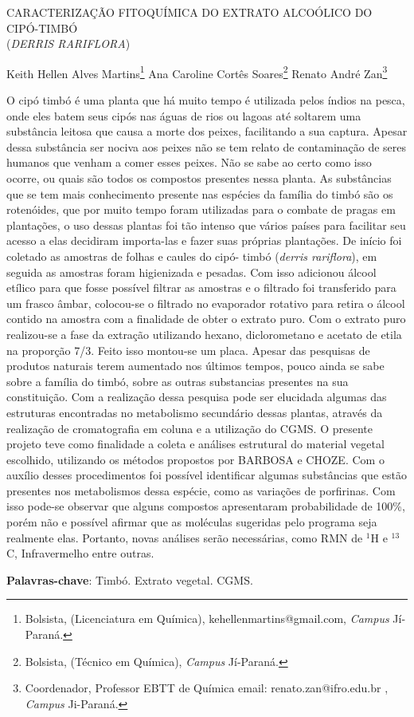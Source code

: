 \documentclass[article,12pt,onesidea,4paper,english,brazil]{abntex2}
\begin{document}
	
	
	\frenchspacing 
	
	\begin{center}
		\LARGE CARACTERIZAÇÃO FITOQUÍMICA DO EXTRATO ALCOÓLICO DO CIPÓ-TIMBÓ \\(\textit{DERRIS RARIFLORA})
		
		\normalsize
		Keith Hellen Alves Martins\footnote{Bolsista, (Licenciatura em Química), kehellenmartins@gmail.com, \textit{Campus} Jí-Paraná.} 
		Ana Caroline Cortês Soares\footnote{Bolsista, (Técnico em Química), \textit{Campus} Jí-Paraná.} 
		Renato André Zan\footnote{Coordenador, Professor EBTT de Química email: renato.zan@ifro.edu.br , \textit{Campus} Ji-Paraná.} 
	\end{center}
	
	\noindent O cipó timbó é uma planta que há muito tempo é utilizada pelos índios na pesca, onde eles batem seus cipós nas águas de rios ou lagoas até soltarem
	uma substância leitosa que causa a morte dos peixes, facilitando a sua captura.
	Apesar dessa substância ser nociva aos peixes não se tem relato de contaminação
	de seres humanos que venham a comer esses peixes. Não se sabe ao certo como
	isso ocorre, ou quais são todos os compostos presentes nessa planta. As
	substâncias que se tem mais conhecimento presente nas espécies da família do
	timbó são os rotenóides, que por muito tempo foram utilizadas para o combate de
	pragas em plantações, o uso dessas plantas foi tão intenso que vários países para
	facilitar seu acesso a elas decidiram importa-las e fazer suas próprias plantações.
	De início foi coletado as amostras de folhas e caules do cipó-
	timbó (\textit{derris rariflora}), em seguida as amostras foram higienizada e pesadas. Com
	isso adicionou álcool etílico para que fosse possível filtrar as amostras e o filtrado foi
	transferido para um frasco âmbar, colocou-se o filtrado no evaporador rotativo para
	retira o álcool contido na amostra com a finalidade de obter o extrato puro. Com o
	extrato puro realizou-se a fase da extração utilizando hexano, diclorometano e
	acetato de etila na proporção 7/3. Feito isso montou-se um placa.
	Apesar das pesquisas de produtos naturais terem aumentado nos últimos tempos,
	pouco ainda se sabe sobre a família do timbó, sobre as outras substancias
	presentes na sua constituição. Com a realização dessa pesquisa pode ser elucidada
	algumas das estruturas encontradas no metabolismo secundário dessas plantas,
	através da realização de cromatografia em coluna e a utilização do CGMS. O
	presente projeto teve como finalidade a coleta e análises estrutural do material
	vegetal escolhido, utilizando os métodos propostos por BARBOSA e CHOZE. Com o
	auxílio desses procedimentos foi possível identificar algumas substâncias que estão
	presentes nos metabolismos dessa espécie, como as variações de porfirinas. Com
	isso pode-se observar que alguns compostos apresentaram probabilidade de 100\%,
	porém não e possível afirmar que as moléculas sugeridas pelo programa seja
	realmente elas. Portanto, novas análises serão necessárias, como RMN
	de $^{1}$H e $^{13}$C, Infravermelho entre outras.
	
	\vspace{\onelineskip}
	
	\noindent
	\textbf{Palavras-chave}: Timbó. Extrato vegetal. CGMS.
	
\end{document}
